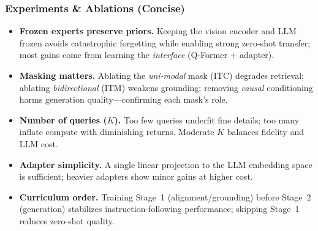 \begin{enrichment}
\begin{enrichment}
        \subsubsection{Experiments \& Ablations (Concise)}
        \begin{itemize}
            \item \textbf{Frozen experts preserve priors.} Keeping the vision encoder and LLM frozen avoids catastrophic forgetting while enabling strong zero-shot transfer; most gains come from learning the \emph{interface} (Q-Former + adapter).
            \item \textbf{Masking matters.} Ablating the \emph{uni-modal} mask (ITC) degrades retrieval; ablating \emph{bidirectional} (ITM) weakens grounding; removing \emph{causal} conditioning harms generation quality---confirming each mask’s role.
            \item \textbf{Number of queries ($K$).} Too few queries underfit fine details; too many inflate compute with diminishing returns. Moderate $K$ balances fidelity and LLM cost.
            \item \textbf{Adapter simplicity.} A single linear projection to the LLM embedding space is sufficient; heavier adapters show minor gains at higher cost.
            \item \textbf{Curriculum order.} Training Stage~1 (alignment/grounding) before Stage~2 (generation) stabilizes instruction-following performance; skipping Stage~1 reduces zero-shot quality.
        \end{itemize}
        
        \newpage
        

\end{enrichment}
\end{enrichment}
